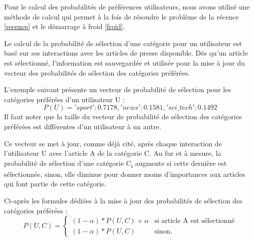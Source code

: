         Pour le calcul des probabilités de préférences utilisateurs, nous avons utilisé une méthode de calcul qui permet à la fois de résoudre le problème de la récence \autoref{recence} et le démarrage à froid \autoref{froid}.

        Le calcul de la probabilité de sélection d'une catégorie pour un utilisateur est basé sur ses interactions avec les articles de presse disponible. Dés qu'un article est sélectionné, l'information est sauvegardée et utilisée pour la mise à jour du vecteur des probabilités de sélection des catégories préférées.

        L'exemple suivant présente un vecteur de probabilité de sélection pour les catégories préférées d'un utilisateur U :
            \[P(U) = {'sport': 0.7178, 'news': 0.1581, 'sci\_tech': 0.1492}\]            
        Il faut noter que la taille du vecteur de probabilité de sélection des catégories préférées est différentes d'un utilisateur à un autre.

        Ce vecteur se met à jour, comme déjà cité, après chaque interaction de l'utilisateur U avec l'article A de la catégorie C. Au fur et à mesure, la probabilité de sélection d'une catégorie C\textsubscript{i} augmente si cette dernière est sélectionnée, sinon, elle diminue pour donner moins d'importances aux articles qui font partie de cette catégorie.

        Ci-après les formules dédiées à la mise à jour des probabilités de sélection des catégories préférées :\\
            \[
            P(U, C) =
            \begin{cases}
                (1-{\alpha}) * {P(U, C)} + {\alpha} & \text{si } \text{article A est sélectionné} \\
                (1-{\alpha}) * {P(U, C)} & \text{sinon.}
            \end{cases}
            \]

